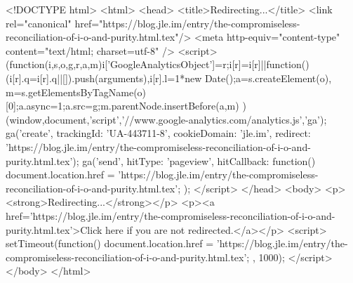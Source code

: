 <!DOCTYPE html>
<html>
<head>
<title>Redirecting...</title>
<link rel="canonical" href="https://blog.jle.im/entry/the-compromiseless-reconciliation-of-i-o-and-purity.html.tex"/>
<meta http-equiv="content-type" content="text/html; charset=utf-8" />
<script>
(function(i,s,o,g,r,a,m){i['GoogleAnalyticsObject']=r;i[r]=i[r]||function(){
(i[r].q=i[r].q||[]).push(arguments)},i[r].l=1*new Date();a=s.createElement(o),
m=s.getElementsByTagName(o)[0];a.async=1;a.src=g;m.parentNode.insertBefore(a,m)
})(window,document,'script','//www.google-analytics.com/analytics.js','ga');
ga('create', { trackingId: 'UA-443711-8', cookieDomain: 'jle.im', redirect: 'https://blog.jle.im/entry/the-compromiseless-reconciliation-of-i-o-and-purity.html.tex'});
ga('send', { hitType: 'pageview', hitCallback: function() { document.location.href = 'https://blog.jle.im/entry/the-compromiseless-reconciliation-of-i-o-and-purity.html.tex'; } });
</script>
</head>
<body>
  <p><strong>Redirecting...</strong></p>
  <p><a href='https://blog.jle.im/entry/the-compromiseless-reconciliation-of-i-o-and-purity.html.tex'>Click here if you are not redirected.</a></p>
  <script>
    setTimeout(function() { document.location.href = 'https://blog.jle.im/entry/the-compromiseless-reconciliation-of-i-o-and-purity.html.tex'; }, 1000);
  </script>
</body>
</html>
